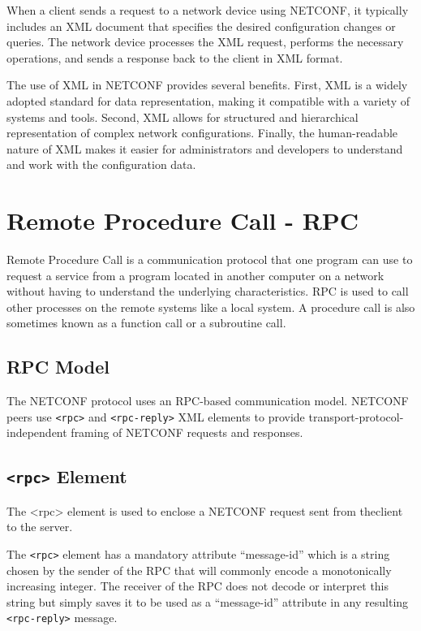 When a client sends a request to a network device using NETCONF, it typically includes an XML document that specifies the desired configuration changes or queries. The network device processes the XML request, performs the necessary operations, and sends a response back to the client in XML format.

The use of XML in NETCONF provides several benefits. First, XML is a widely adopted standard for data representation, making it compatible with a variety of systems and tools. Second, XML allows for structured and hierarchical representation of complex network configurations. Finally, the human-readable nature of XML makes it easier for administrators and developers to understand and work with the configuration data.


\section{Remote Procedure Call - RPC}
Remote Procedure Call is a communication protocol that one program can use to request a service from a program located in another computer on a network without having to understand the underlying characteristics. RPC is used to call other processes on the remote systems like a local system. A procedure call is also sometimes known as a function call or a subroutine call.

\subsection*{RPC Model}

The NETCONF protocol uses an RPC-based communication model. NETCONF peers use \texttt{<rpc>} and \texttt{<rpc-reply>} XML elements to provide transport-protocol-independent framing of NETCONF requests and responses.

\subsection*{\texttt{<rpc>} Element}
The \textless{rpc}\textgreater{} element is used to enclose a NETCONF request sent from theclient to the server.

The \texttt{<rpc>} element has a mandatory attribute ``message-id'' which is a string chosen by the sender of the RPC that will commonly encode a monotonically increasing integer. The receiver of the RPC does not decode or interpret this string but simply saves it to be used as a ``message-id'' attribute in any resulting \texttt{<rpc-reply>} message. 

